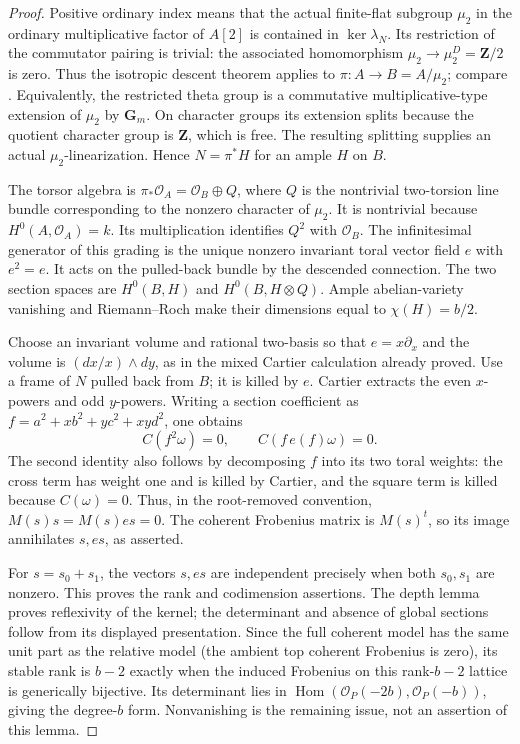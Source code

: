 \begin{proof}
Positive ordinary index means that the actual finite-flat subgroup
$\mu_2$ in the ordinary multiplicative factor of $A[2]$ is contained
in $\ker\lambda_N$. Its restriction of the commutator pairing is
trivial: the associated homomorphism
$\mu_2\to\mu_2^D=\mathbf Z/2$ is zero.
Thus the isotropic descent theorem applies to
$\pi:A\to B=A/\mu_2$; compare
\cite[Corollary~8.11 and proof, p.~117]
{EdixhovenVanDerGeerMoonenAV}.
Equivalently, the restricted theta group is a commutative
multiplicative-type extension of $\mu_2$ by $\mathbf G_m$.
On character groups its extension splits because the quotient
character group is $\mathbf Z$, which is free.
The resulting splitting supplies an actual $\mu_2$-linearization.
Hence $N=\pi^*H$ for an ample $H$ on $B$.

The torsor algebra is
$\pi_*\mathcal O_A=\mathcal O_B\oplus Q$, where $Q$ is the
nontrivial two-torsion line bundle corresponding to the nonzero
character of $\mu_2$. It is nontrivial because
$H^0(A,\mathcal O_A)=k$. Its multiplication identifies $Q^2$ with
$\mathcal O_B$. The infinitesimal generator of this grading is
the unique nonzero invariant toral vector field $e$ with $e^2=e$.
It acts on the pulled-back bundle by the descended connection.
The two section spaces are $H^0(B,H)$ and $H^0(B,H\otimes Q)$.
Ample abelian-variety vanishing and Riemann--Roch make their
dimensions equal to $\chi(H)=b/2$.

Choose an invariant volume and rational two-basis so that
$e=x\partial_x$ and the volume is $(dx/x)\wedge dy$, as in the
mixed Cartier calculation already proved. Use a frame of $N$
pulled back from $B$; it is killed by $e$.
Cartier extracts the even $x$-powers and odd $y$-powers.
Writing a section coefficient as
$f=a^2+xb^2+yc^2+xyd^2$, one obtains
\[
 C(f^2\omega)=0,\qquad C(f\,e(f)\omega)=0.
\]
The second identity also follows by decomposing $f$ into its two
toral weights: the cross term has weight one and is killed by
Cartier, and the square term is killed because $C(\omega)=0$.
Thus, in the root-removed convention,
$M(s)s=M(s)es=0$. The coherent Frobenius matrix is $M(s)^t$,
so its image annihilates $s,es$, as asserted.

For $s=s_0+s_1$, the vectors $s,es$ are independent precisely
when both $s_0,s_1$ are nonzero. This proves the rank and
codimension assertions. The depth lemma proves reflexivity of
the kernel; the determinant and absence of global sections follow
from its displayed presentation. Since the full coherent model
has the same unit part as the relative model (the ambient top
coherent Frobenius is zero), its stable rank is $b-2$ exactly when
the induced Frobenius on this rank-$b-2$ lattice is generically
bijective. Its determinant lies in
$\operatorname{Hom}(\mathcal O_P(-2b),\mathcal O_P(-b))$,
giving the degree-$b$ form. Nonvanishing is the remaining issue,
not an assertion of this lemma.
\end{proof}

